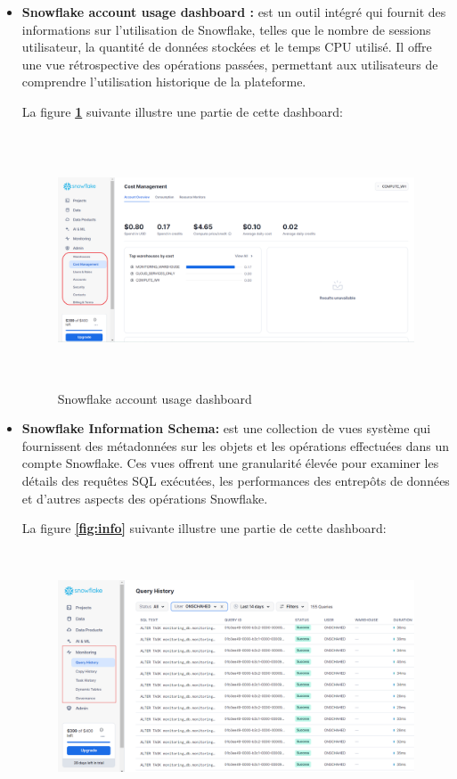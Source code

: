 \begin{itemize}
    \item\textbf{Snowflake account usage dashboard :}  est un outil intégré qui fournit des informations sur l'utilisation de Snowflake, telles que le nombre de sessions utilisateur, 
    la quantité de données stockées et le temps CPU utilisé.
    Il offre une vue rétrospective des opérations passées, permettant aux utilisateurs de comprendre l'utilisation historique de la plateforme. 
    \par La figure \textbf{\ref{fig:SAU}} suivante illustre une partie de cette dashboard:
            \begin{figure}[H]
            \centering
            \includegraphics[width =13cm, height=7.5cm]{img/captures/account_usage}
            \caption{Snowflake account usage dashboard}
            \label{fig:SAU}
            \end{figure}
    \item\textbf{Snowflake Information Schema:} est une collection de vues système qui fournissent des métadonnées sur les objets et les opérations effectuées dans un compte Snowflake. 
    Ces vues offrent une granularité élevée pour examiner les détails des requêtes SQL exécutées, les performances des entrepôts de données et d'autres aspects des opérations Snowflake. 
    \par La figure \textbf{\ref{fig:info}} suivante illustre une partie de cette dashboard:
            \begin{figure}[H]
            \centering
            \includegraphics[width =13cm, height=7.5cm]{img/captures/info}

\end{figure}
\end{itemize}
